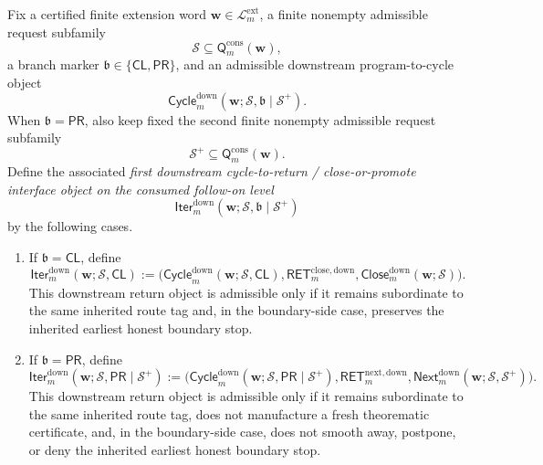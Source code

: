 \begin{definition}
\label{def:first-downstream-cycle-to-return-close-or-promote-interface-object-on-the-consumed-follow-on-level}
Fix a certified finite extension word \(\mathbf w\in\mathcal L^{\mathrm{ext}}_{m}\), a finite nonempty admissible request subfamily
\[
  \mathcal S \subseteq \mathsf{Q}^{\mathrm{cons}}_{m}(\mathbf w),
\]
a branch marker \(\mathfrak b\in\{\mathsf{CL},\mathsf{PR}\}\), and an admissible downstream program-to-cycle object
\[
  \mathsf{Cycle}^{\mathrm{down}}_{m}(\mathbf w;\mathcal S,\mathfrak b\mid\mathcal S^{+}).
\]
When \(\mathfrak b=\mathsf{PR}\), also keep fixed the second finite nonempty admissible request subfamily
\[
  \mathcal S^{+}\subseteq \mathsf{Q}^{\mathrm{cons}}_{m}(\mathbf w).
\]
Define the associated \emph{first downstream cycle-to-return / close-or-promote interface object on the consumed follow-on level}
\[
  \mathsf{Iter}^{\mathrm{down}}_{m}(\mathbf w;\mathcal S,\mathfrak b\mid\mathcal S^{+})
\]
by the following cases.
\begin{enumerate}[label=(\roman*)]
  \item If \(\mathfrak b=\mathsf{CL}\), define
\[
  \mathsf{Iter}^{\mathrm{down}}_{m}(\mathbf w;\mathcal S,\mathsf{CL})
  :=
  \bigl(\mathsf{Cycle}^{\mathrm{down}}_{m}(\mathbf w;\mathcal S,\mathsf{CL}),\mathsf{RET}^{\mathrm{close,down}}_{m},\mathsf{Close}^{\mathrm{down}}_{m}(\mathbf w;\mathcal S)\bigr).
\]
This downstream return object is admissible only if it remains subordinate to the same inherited route tag and, in the boundary-side case, preserves the inherited earliest honest boundary stop.

  \item If \(\mathfrak b=\mathsf{PR}\), define
\[
  \mathsf{Iter}^{\mathrm{down}}_{m}(\mathbf w;\mathcal S,\mathsf{PR}\mid\mathcal S^{+})
  :=
  \bigl(\mathsf{Cycle}^{\mathrm{down}}_{m}(\mathbf w;\mathcal S,\mathsf{PR}\mid\mathcal S^{+}),\mathsf{RET}^{\mathrm{next,down}}_{m},\mathsf{Next}^{\mathrm{down}}_{m}(\mathbf w;\mathcal S,\mathcal S^{+})\bigr).
\]
This downstream return object is admissible only if it remains subordinate to the same inherited route tag, does not manufacture a fresh theorematic certificate, and, in the boundary-side case, does not smooth away, postpone, or deny the inherited earliest honest boundary stop.
\end{enumerate}
\end{definition}

